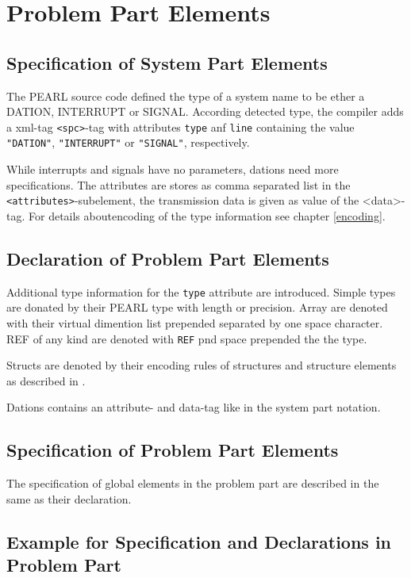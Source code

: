 \section{Problem Part Elements}
\subsection{Specification of System Part Elements}
The PEARL source code defined the type of a system name to be ether a DATION, 
INTERRUPT or SIGNAL. According detected type, the compiler 
adds a xml-tag \verb|<spc>|-tag with attributes \verb|type| anf \verb|line|
containing the value \verb|"DATION"|, \verb|"INTERRUPT"| or \verb|"SIGNAL"|,
 respectively.

While interrupts and signals have no parameters, dations need more
specifications. The attributes are stores as comma separated list in the
\verb|<attributes>|-subelement, the transmission data is given as value
of the <data>-tag. For details aboutencoding of the type information
see chapter \ref{encoding}. 

\subsection{Declaration of Problem Part Elements}

Additional type information for the \verb|type| attribute are introduced.
Simple types are donated by their PEARL type with length or precision.
Array are denoted with their virtual dimention list prepended separated by
one space character.
REF of any kind are denoted with  \texttt{REF} pnd space prepended the the
type.

Structs are denoted by their encoding rules of
structures and structure elements  as described in \cite{runtime}.

Dations contains an attribute- and data-tag like in the system part notation.

\subsection{Specification of Problem Part Elements}
The specification of global  elements in the problem part are described 
in the same as their declaration.

\subsection{Example for Specification and Declarations in Problem Part}


